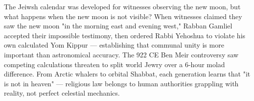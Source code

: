 The Jeiwsh calendar was developed for witnesses observing the new moon, but what happens when the new moon is not visible? When witnesses claimed they saw the new moon "in the morning east and evening west," Rabban Gamliel accepted their impossible testimony, then ordered Rabbi Yehoshua to violate his own calculated Yom Kippur — establishing that communal unity is more important than astronomical accuracy. The 922 CE Ben Meir controversy saw competing calculations threaten to split world Jewry over a 6-hour molad difference. From Arctic whalers to orbital Shabbat, each generation learns that "it is not in heaven" — religious law belongs to human authorities grappling with reality, not perfect celestial mechanics.
